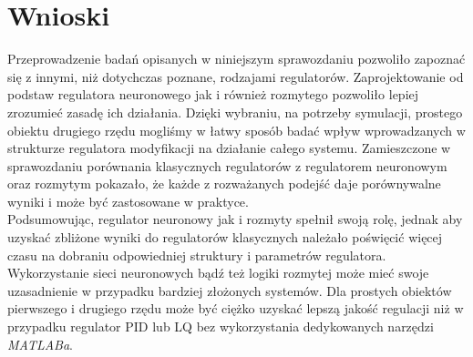 \chapter{Wnioski}
Przeprowadzenie badań opisanych w niniejszym sprawozdaniu pozwoliło zapoznać się z innymi, niż dotychczas poznane, rodzajami regulatorów. Zaprojektowanie od podstaw regulatora neuronowego jak i również rozmytego pozwoliło lepiej zrozumieć zasadę ich działania. Dzięki wybraniu, na potrzeby symulacji, prostego obiektu drugiego rzędu mogliśmy w łatwy sposób badać wpływ wprowadzanych w strukturze regulatora modyfikacji na działanie całego systemu. Zamieszczone w sprawozdaniu porównania klasycznych regulatorów z regulatorem neuronowym oraz rozmytym pokazało, że każde z rozważanych podejść daje porównywalne wyniki i może być zastosowane w praktyce. \\
Podsumowując, regulator neuronowy jak i rozmyty spełnił swoją rolę, jednak aby uzyskać zbliżone wyniki do regulatorów klasycznych należało poświęcić więcej czasu na dobraniu odpowiedniej struktury i parametrów regulatora. Wykorzystanie sieci neuronowych bąd\'z też logiki rozmytej może mieć swoje uzasadnienie w przypadku bardziej złożonych systemów. Dla prostych obiektów pierwszego i drugiego rzędu może być ciężko uzyskać lepszą jakość regulacji niż w przypadku regulator PID lub LQ bez wykorzystania dedykowanych narzędzi \textit{MATLABa}.